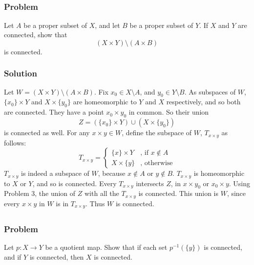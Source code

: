 
\setcounter{subsection}{8} %
\subsection{}

\subsubsection{Problem}
Let $A$ be a proper subset of $X$, and let $B$ be a proper subset of $Y$. If $X$ and $Y$ are connected, show that
\[(X \times Y) \setminus (A \times B)\]
is connected.

\subsubsection{Solution}
Let $W = (X \times Y) \setminus (A \times B)$. Fix $x_0 \in X \setminus A$, and $y_0 \in Y \setminus B$. As subspaces of $W$, $\{x_0\} \times Y$ and $X \times \{y_0\}$ are homeomorphic to $Y$ and $X$ respectively, and so both are connected.  They have a point $x_0 \times y_0$ in common. So their union
\[Z = (\{x_0\} \times Y) \cup (X \times \{y_0\})\]
is connected as well. For any $x \times y \in W$, define the subspace of $W$, $T_{x \times y}$ as follows:
\[T_{x \times y} =
\begin{cases}
\{x\} \times Y &\textrm{, if } x \notin A \\
X \times \{y\} &\textrm{, otherwise}
\end{cases}
\]
$T_{x \times y}$ is indeed a subspace of $W$, because $x \notin A$ or $y \notin B$. $T_{x \times y}$ is homeomorphic to $X$ or $Y$, and so is connected.  Every $T_{x \times y}$ intersects $Z$, in $x \times y_0$ or $x_0 \times y$. Using Problem 3, the union of $Z$ with all the $T_{x\times y}$ is connected. This union is $W$, since every $x \times y$ in $W$ is in $T_{x \times y}$. Thus $W$ is connected.


\setcounter{subsection}{10} %
\subsection{}

\subsubsection{Problem}
Let $p : X \to Y$ be a quotient map. Show that if each set $p^{-1}(\{y\})$ is connected, and if $Y$ is connected, then $X$ is connected.

